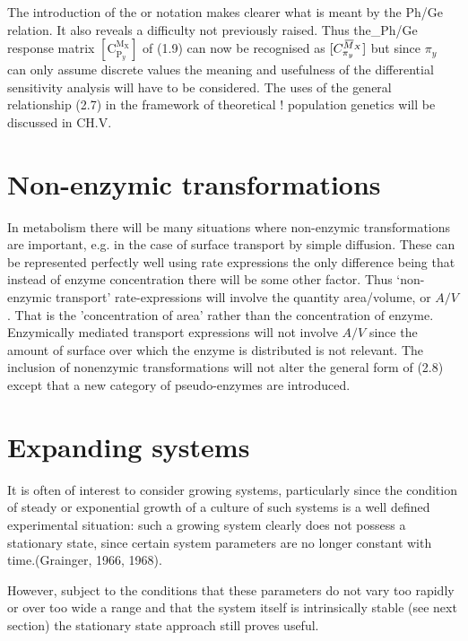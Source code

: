 The introduction of the or notation makes clearer what is meant by the Ph/Ge relation. It also reveals a difficulty not previously raised. Thus the_Ph/Ge response matrix $\left[\mathrm{C}_{\mathrm{P}_y}^{\mathrm{M_X}}\right]$ of (1.9) can now be recognised as $[C^{\,\overline{\!{M}}_X}_{\pi_y}]$ but since ${\pi}_y$ can only assume discrete values the meaning and usefulness of the differential sensitivity analysis will have to be considered. The uses of the general relationship (2.7) in the framework of theoretical ! population genetics will be discussed in CH.V.

\section{Non-enzymic transformations}

In metabolism there will be many situations where non-enzymic transformations are important, e.g. in the case of surface transport by simple diffusion. These can be represented perfectly well using rate expressions the only difference being that instead of enzyme concentration there will be some other factor. Thus `non-enzymic transport' rate-expressions will involve the quantity area/volume, or $A/V$. That is the 'concentration of area' rather than the concentration of enzyme. Enzymically mediated transport expressions will not involve $A/V$ since the amount of surface over which the enzyme is distributed is not relevant. The inclusion of nonenzymic transformations will not alter the general form of (2.8) except that a new category of pseudo-enzymes are introduced.

\section{Expanding systems}

It is often of interest to consider growing systems, particularly since the condition of steady or exponential growth of a culture of such systems is a well defined experimental situation: such a growing system clearly does not possess a stationary state, since certain system parameters are no longer constant with time.(Grainger, 1966, 1968).

However, subject to the conditions that these parameters do not vary too rapidly or over too wide a range and that the system itself is intrinsically stable (see next section) the stationary state approach still proves useful.

